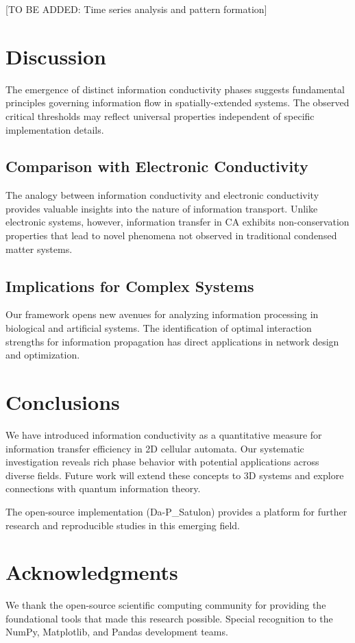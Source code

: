 \documentclass[twocolumn,showpacs,preprintnumbers,amsmath,amssymb,prb]{revtex4-2}
\begin{document}
[TO BE ADDED: Time series analysis and pattern formation]

\section{Discussion}

The emergence of distinct information conductivity phases suggests fundamental principles governing information flow in spatially-extended systems. The observed critical thresholds may reflect universal properties independent of specific implementation details.

\subsection{Comparison with Electronic Conductivity}

The analogy between information conductivity and electronic conductivity provides valuable insights into the nature of information transport. Unlike electronic systems, however, information transfer in CA exhibits non-conservation properties that lead to novel phenomena not observed in traditional condensed matter systems.

\subsection{Implications for Complex Systems}

Our framework opens new avenues for analyzing information processing in biological and artificial systems. The identification of optimal interaction strengths for information propagation has direct applications in network design and optimization.

\section{Conclusions}

We have introduced information conductivity as a quantitative measure for information transfer efficiency in 2D cellular automata. Our systematic investigation reveals rich phase behavior with potential applications across diverse fields. Future work will extend these concepts to 3D systems and explore connections with quantum information theory.

The open-source implementation (Da-P\_Satulon) provides a platform for further research and reproducible studies in this emerging field.

\section{Acknowledgments}

We thank the open-source scientific computing community for providing the foundational tools that made this research possible. Special recognition to the NumPy, Matplotlib, and Pandas development teams.



\end{document}
